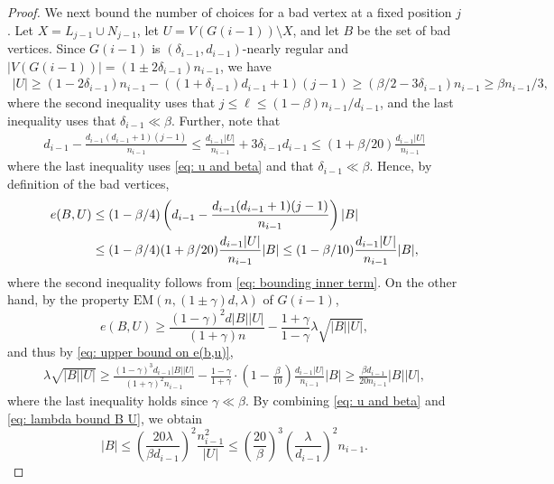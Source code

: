 \documentclass[reqno,a4paper]{amsart}
\theoremstyle{definition}
\newcommand{\EM}{\mathrm{EM}}
\begin{document}
\begin{proof}
We next bound the number of choices for a bad vertex at a fixed position $j$. Let $X=L_{j-1}\cup N_{j-1}$, let $U=V(G(i-1))\setminus X$, and let $B$ be the set of bad vertices. Since $G(i-1)$ is $(\delta_{i-1},d_{i-1})$-nearly regular and $|V(G(i-1))|=(1\pm2\delta_{i-1})n_{i-1}$, we have
\begin{align}
    |U|\ge (1-2\delta_{i-1})n_{i-1}-((1+\delta_{i-1})d_{i-1}+1)(j-1)\ge \left(\beta/2-3\delta_{i-1}\right)n_{i-1}\ge \beta n_{i-1}/3,\label{eq: u and beta}
\end{align}
where the second inequality uses that $j\le\ell\le(1-\beta)n_{i-1}/d_{i-1}$, and the last inequality uses that $\delta_{i-1}\ll \beta$. 
Further, note that
\begin{align}
    d_{i-1}-\frac{d_{i-1}(d_{i-1}+1)(j-1)}{n_{i-1}}\le \frac{d_{i-1}|U|}{n_{i-1}}+3\delta_{i-1}d_{i-1}\le (1+\beta/20)\frac{d_{i-1}|U|}{n_{i-1}}\label{eq: bounding inner term}
\end{align}
where the last inequality uses \eqref{eq: u and beta} and that $\delta_{i-1}\ll \beta$. 
Hence, by definition of the bad vertices,
\begin{align}
    e(B,U)&\le (1-\beta/4)\left(d_{i-1}-\frac{d_{i-1}(d_{i-1}+1)(j-1)}{n_{i-1}}\right)|B|\notag\\
    &\le (1-\beta/4)(1+\beta/20)\frac{d_{i-1}|U|}{n_{i-1}}|B|\le (1-\beta/10)\frac{d_{i-1}|U|}{n_{i-1}}|B|,\label{eq: upper bound on e(b,u)}
\end{align}
where the second inequality follows from \eqref{eq: bounding inner term}.
On the other hand, by the property $\EM(n,(1\pm \gamma)d,\lambda)$ of $G(i-1)$,
\[
e(B,U)\ge \frac{(1-\gamma)^2d|B||U|}{(1+\gamma)n}-\frac{1+\gamma}{1-\gamma}\lambda\sqrt{|B||U|},
\]
and thus by \eqref{eq: upper bound on e(b,u)},
\begin{align}\label{eq: lambda bound B U}
    \lambda\sqrt{|B||U|}\ge \frac{(1-\gamma)^3d_{i-1}|B||U|}{(1+\gamma)^2n_{i-1}}-\frac{1-\gamma}{1+\gamma}\cdot \left(1-\frac{\beta}{10}\right)\frac{d_{i-1}|U|}{n_{i-1}}|B|\ge \frac{\beta d_{i-1}}{20n_{i-1}}|B||U|,
\end{align}
where the last inequality holds since $\gamma\ll \beta$. By combining \eqref{eq: u and beta} and \eqref{eq: lambda bound B U}, we obtain
\begin{equation}\label{eq: bad-choices}
    |B|\le \left(\frac{20\lambda}{\beta d_{i-1}}\right)^2\frac{n_{i-1}^2}{|U|}\le \left(\frac{20}{\beta}\right)^3\left(\frac{\lambda}{d_{i-1}}\right)^2n_{i-1}.
\end{equation}


\end{proof}
\end{document}
